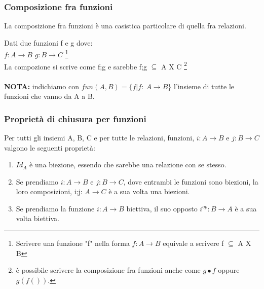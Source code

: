 \subsubsection{Composizione fra funzioni}
La composizione fra funzioni è una casistica particolare di quella fra relazioni.
\begin{example}
    Dati due funzioni f e g dove:\\
   $f: A \longrightarrow B$ \hspace{.5cm} $g: B \longrightarrow C$ \footnote{Scrivere una funzione "f" nella forma $f: A \longrightarrow B$  equivale a scrivere f $\subseteq$ A X B}\\ 
    La compozione si scrive come f;g e sarebbe f;g $\subseteq$ A X C \footnote{è possibile scrivere la composizione fra funzioni anche come $g \bullet f$ oppure $g(f())$.}\\ \\
    \textbf{NOTA:} indichiamo con $fun(A,B) = \{f | f: \: A \longrightarrow B\}$ l'insieme di tutte le funzioni che vanno da A a B.
\end{example}

\subsubsection{Proprietà di chiusura per funzioni}
Per tutti gli insiemi A, B, C e per tutte le relazioni, funzioni, $i: A \longrightarrow B$ e $j: B \longrightarrow C$ valgono le seguenti proprietà:
\begin{enumerate}
    \item $Id_A$ è una biezione, essendo che sarebbe una relazione con se stesso.
    \item Se prendiamo $i: A \longrightarrow B$ e $j: B \longrightarrow C$, dove entrambi le funzioni sono biezioni, la loro composizioni, i;j: $A \longrightarrow C$ è a sua volta una biezioni.
    \item Se prendiamo la funzione $i: A \longrightarrow B$ biettiva, il suo opposto $i^{op}: B \longrightarrow A$ è a sua volta biettiva.
\end{enumerate}

